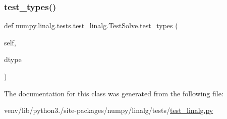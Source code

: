 \mbox{\label{classnumpy_1_1linalg_1_1tests_1_1test__linalg_1_1TestSolve_a7267d0832d1cc9354ccbb92161433d7e}} 
\subsubsection{\texorpdfstring{test\+\_\+types()}{test\_types()}}
{\footnotesize\ttfamily def numpy.\+linalg.\+tests.\+test\+\_\+linalg.\+Test\+Solve.\+test\+\_\+types (\begin{DoxyParamCaption}\item[{}]{self,  }\item[{}]{dtype }\end{DoxyParamCaption})}



The documentation for this class was generated from the following file\+:\begin{DoxyCompactItemize}
\item 
venv/lib/python3./site-\/packages/numpy/linalg/tests/\hyperlink{test__linalg_8py}{test\+\_\+linalg.\+py}\end{DoxyCompactItemize}
